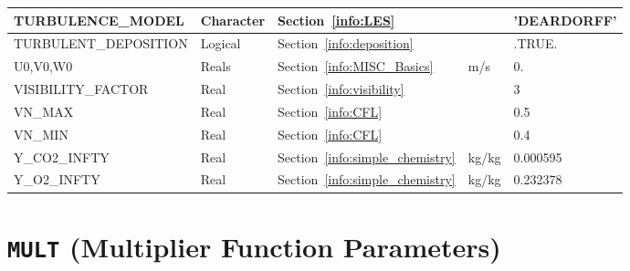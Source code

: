 \documentclass[11pt]{book}
\begin{document}
\begin{longtable}{@{\extracolsep{\fill}}|l|l|l|l|l|}
{\ct TURBULENCE\_MODEL}                         & Character     & Section~\ref{info:LES}                                &               & {\ct 'DEARDORFF'} \\ \hline
{\ct TURBULENT\_DEPOSITION}                     & Logical       & Section~\ref{info:deposition}                         &               & {\ct .TRUE.}      \\ \hline
{\ct U0,V0,W0}                                  & Reals         & Section~\ref{info:MISC_Basics}                        & m/s           & 0.                \\ \hline
{\ct VISIBILITY\_FACTOR}                        & Real          & Section~\ref{info:visibility}                         &               & 3                 \\ \hline
{\ct VN\_MAX}                                   & Real          & Section~\ref{info:CFL}                                &               & 0.5               \\ \hline
{\ct VN\_MIN}                                   & Real          & Section~\ref{info:CFL}                                &               & 0.4               \\ \hline
{\ct Y\_CO2\_INFTY}                             & Real          & Section~\ref{info:simple_chemistry}                   &  kg/kg        & 0.000595          \\ \hline
{\ct Y\_O2\_INFTY}                              & Real          & Section~\ref{info:simple_chemistry}                   &  kg/kg        & 0.232378          \\ \hline
\end{longtable}




\vspace{\baselineskip}

\section{\texorpdfstring{{\tt MULT}}{MULT} (Multiplier Function Parameters)}
\end{document}
